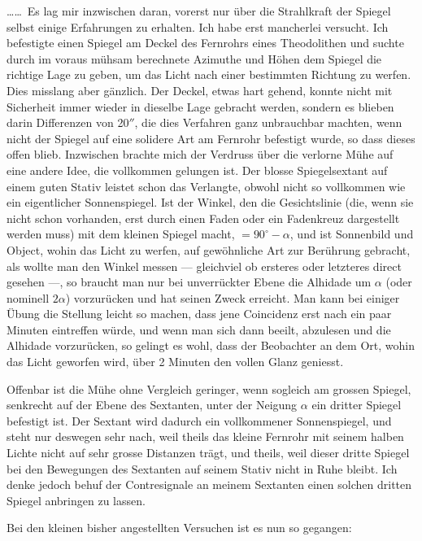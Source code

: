 \documentclass[12pt,a4paper]{article}
\theoremstyle{plain}
\theoremstyle{definition}
\theoremstyle{remark}
\begin{document}
\ldots\ldots\ Es lag mir inzwischen daran, vorerst nur \"uber die Strahlkraft der Spiegel selbst einige Erfahrungen zu erhalten. Ich habe erst mancherlei versucht. Ich befestigte einen Spiegel am Deckel des Fernrohrs eines Theodolithen und suchte durch im voraus m\"uhsam berechnete Azimuthe und H\"ohen dem Spiegel die richtige Lage zu geben, um das Licht nach einer bestimmten Richtung zu werfen. Dies misslang aber g\"anzlich. Der Deckel, etwas hart gehend, konnte nicht mit Sicherheit immer wieder in dieselbe Lage gebracht werden, sondern es blieben darin Differenzen von 20$''$, die dies Verfahren ganz unbrauchbar machten, wenn nicht der Spiegel auf eine solidere Art am Fernrohr befestigt wurde, so dass dieses offen blieb. Inzwischen brachte mich der Verdruss \"uber die verlorne M\"uhe auf eine andere Idee, die vollkommen gelungen ist. Der blosse Spiegelsextant auf einem guten Stativ leistet schon das Verlangte, obwohl nicht so vollkommen wie ein eigentlicher Sonnenspiegel. Ist der Winkel, den die Gesichtslinie (die, wenn sie nicht schon vorhanden, erst durch einen Faden oder ein Fadenkreuz dargestellt werden muss) mit dem kleinen Spiegel macht, $= 90^{\circ} - \alpha$, und ist Sonnenbild und Object, wohin das Licht zu werfen, auf gew\"ohnliche Art zur Ber\"uhrung gebracht, als wollte man den Winkel messen --- gleichviel ob ersteres oder letzteres direct gesehen ---, so braucht man nur bei unverr\"uckter Ebene die Alhidade um $\alpha$ (oder nominell $2\alpha$) vorzur\"ucken und hat seinen Zweck erreicht. Man kann bei einiger \"Ubung die Stellung leicht so machen, dass jene Coincidenz erst nach ein paar Minuten eintreffen w\"urde, und wenn man sich dann beeilt, abzulesen und die Alhidade vorzur\"ucken, so gelingt es wohl, dass der Beobachter an dem Ort, wohin das Licht geworfen wird, \"uber 2 Minuten den vollen Glanz geniesst.

Offenbar ist die M\"uhe ohne Vergleich geringer, wenn sogleich am grossen Spiegel, senkrecht auf der Ebene des Sextanten, unter der Neigung $\alpha$ ein dritter Spiegel befestigt ist. Der Sextant wird dadurch ein vollkommener Sonnenspiegel, und steht nur deswegen sehr nach, weil theils das kleine Fernrohr mit seinem halben Lichte nicht auf sehr grosse Distanzen tr\"agt, und theils, weil dieser dritte Spiegel bei den Bewegungen des Sextanten auf seinem Stativ nicht in Ruhe bleibt. Ich denke jedoch behuf der Contresignale an meinem Sextanten einen solchen dritten Spiegel anbringen zu lassen.

Bei den kleinen bisher angestellten Versuchen ist es nun so gegangen:
\end{document}

